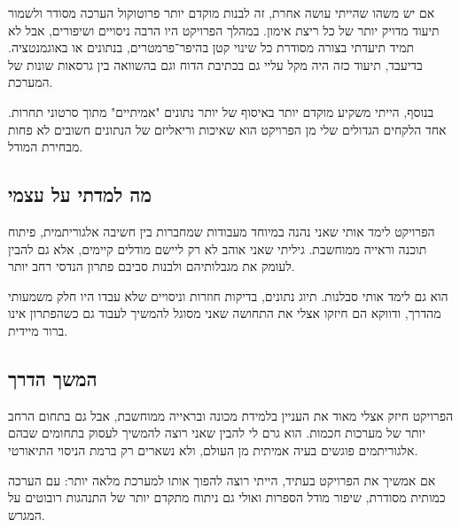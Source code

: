 אם יש משהו שהייתי עושה אחרת, זה לבנות מוקדם יותר פרוטוקול הערכה מסודר
ולשמור תיעוד מדויק יותר של כל ריצת אימון. במהלך הפרויקט היו הרבה
ניסויים ושיפורים, אבל לא תמיד תיעדתי בצורה מסודרת כל שינוי קטן
בהיפר־פרמטרים, בנתונים או באוגמנטציה. בדיעבד, תיעוד כזה היה מקל עליי
גם בכתיבת הדוח וגם בהשוואה בין גרסאות שונות של המערכת.

בנוסף, הייתי משקיע מוקדם יותר באיסוף של יותר נתונים "אמיתיים" מתוך
סרטוני תחרות. אחד הלקחים הגדולים שלי מן הפרויקט הוא שאיכות וריאליזם של
הנתונים חשובים לא פחות מבחירת המודל.

\subsection{מה למדתי על עצמי}

הפרויקט לימד אותי שאני נהנה במיוחד מעבודות שמחברות בין חשיבה
אלגוריתמית, פיתוח תוכנה וראייה ממוחשבת. גיליתי שאני אוהב לא רק ליישם
מודלים קיימים, אלא גם להבין לעומק את מגבלותיהם ולבנות סביבם פתרון
הנדסי רחב יותר.

הוא גם לימד אותי סבלנות. תיוג נתונים, בדיקות חוזרות וניסויים שלא עבדו
היו חלק משמעותי מהדרך, ודווקא הם חיזקו אצלי את התחושה שאני מסוגל
להמשיך לעבוד גם כשהפתרון אינו ברור מיידית.

\subsection{המשך הדרך}

הפרויקט חיזק אצלי מאוד את העניין בלמידת מכונה ובראייה ממוחשבת, אבל גם
בתחום הרחב יותר של מערכות חכמות. הוא גרם לי להבין שאני רוצה להמשיך
לעסוק בתחומים שבהם אלגוריתמים פוגשים בעיה אמיתית מן העולם, ולא נשארים
רק ברמת הניסוי התיאורטי.

אם אמשיך את הפרויקט בעתיד, הייתי רוצה להפוך אותו למערכת מלאה יותר:
עם הערכה כמותית מסודרת, שיפור מודל הספרות ואולי גם ניתוח מתקדם יותר של
התנהגות רובוטים על המגרש.
